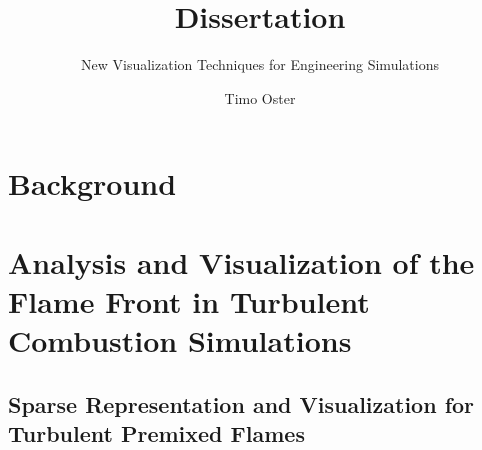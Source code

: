 \documentclass[BCOR=15mm, DIV=8]{scrbook}
\title{ Dissertation }
\subtitle{ New Visualization Techniques for Engineering Simulations }
\author{ Timo Oster }
\begin{document}

\frontmatter

\maketitle

\cleardoublepage
{}
\tableofcontents

\mainmatter



\part{Background} %
\label{part:background}






\part%
        {Analysis and Visualization of the Flame Front
         in Turbulent Combustion Simulations} %
\label{part:flame_vis}

\chapter[Sparse Representation for Turbulent Premixed Flames]
        {Sparse Representation and Visualization for Turbulent Premixed Flames} %
\label{cha:sparse_representation}
%
%







%
\end{document}
